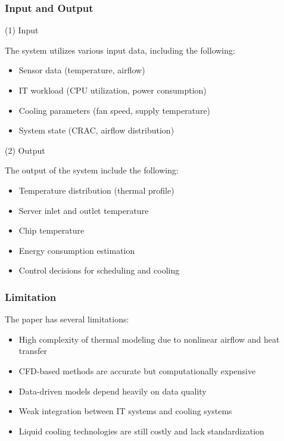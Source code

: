 \documentclass[12pt,a4paper]{article}
\begin{document}
        \subsubsection{ Input and Output}

        (1) Input
        
                    The system utilizes various input data, including the following:                    
        \begin{itemize}
                \item Sensor data (temperature, airflow)
                \item IT workload (CPU utilization, power consumption)
                \item Cooling parameters (fan speed, supply temperature)
                \item System state (CRAC, airflow distribution)
        \end{itemize}

        (2) Output
        
                    The output of the system include the following:                   
        \begin{itemize}
            \item Temperature distribution (thermal profile)
            \item Server inlet and outlet temperature
            \item Chip temperature
            \item Energy consumption estimation
            \item Control decisions for scheduling and cooling
        \end{itemize}
        
        \subsubsection{Limitation}

                     The paper has several limitations:      
                \begin{itemize}
                    \item High complexity of thermal modeling due to nonlinear airflow and heat transfer
                \end{itemize}
                \begin{itemize}
                    \item CFD-based methods are accurate but computationally expensive
                    \item Data-driven models depend heavily on data quality
                    \item Weak integration between IT systems and cooling systems
                    \item Liquid cooling technologies are still costly and lack standardization
                \end{itemize}
          
\end{document}
